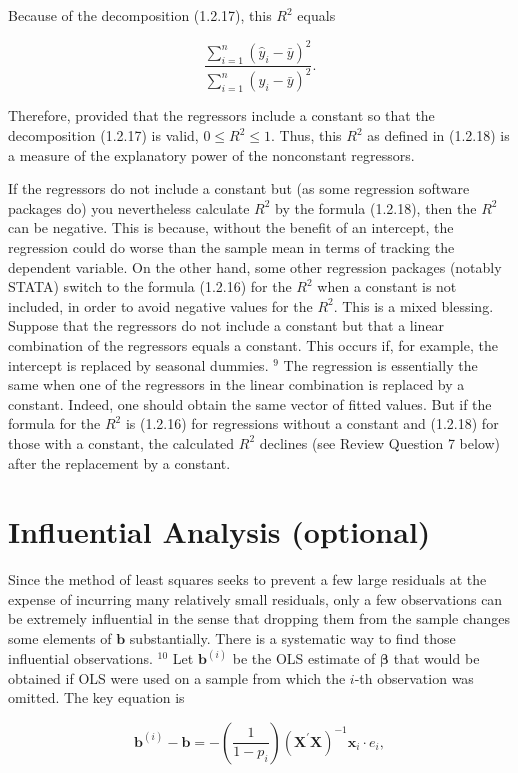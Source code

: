 \documentclass[10pt]{article}
\begin{document}
Because of the decomposition (1.2.17), this $R^{2}$ equals

$$
\frac{\sum_{i=1}^{n}\left(\hat{y}_{i}-\bar{y}\right)^{2}}{\sum_{i=1}^{n}\left(y_{i}-\bar{y}\right)^{2}} .
$$

Therefore, provided that the regressors include a constant so that the decomposition (1.2.17) is valid, $0 \leq R^{2} \leq 1$. Thus, this $R^{2}$ as defined in (1.2.18) is a measure of the explanatory power of the nonconstant regressors.

If the regressors do not include a constant but (as some regression software packages do) you nevertheless calculate $R^{2}$ by the formula (1.2.18), then the $R^{2}$ can be negative. This is because, without the benefit of an intercept, the regression could do worse than the sample mean in terms of tracking the dependent variable. On the other hand, some other regression packages (notably STATA) switch to the formula (1.2.16) for the $R^{2}$ when a constant is not included, in order to avoid negative values for the $R^{2}$. This is a mixed blessing. Suppose that the regressors do not include a constant but that a linear combination of the regressors equals a constant. This occurs if, for example, the intercept is replaced by seasonal dummies. ${ }^{9}$ The regression is essentially the same when one of the regressors in the linear combination is replaced by a constant. Indeed, one should obtain the same vector of fitted values. But if the formula for the $R^{2}$ is (1.2.16) for regressions without a constant and (1.2.18) for those with a constant, the calculated $R^{2}$ declines (see Review Question 7 below) after the replacement by a constant.

\section*{Influential Analysis (optional)}
Since the method of least squares seeks to prevent a few large residuals at the expense of incurring many relatively small residuals, only a few observations can be extremely influential in the sense that dropping them from the sample changes some elements of $\mathbf{b}$ substantially. There is a systematic way to find those influential observations. ${ }^{10}$ Let $\mathbf{b}^{(i)}$ be the OLS estimate of $\boldsymbol{\beta}$ that would be obtained if OLS were used on a sample from which the $i$-th observation was omitted. The key equation is


\begin{equation*}
\mathbf{b}^{(i)}-\mathbf{b}=-\left(\frac{1}{1-p_{i}}\right)\left(\mathbf{X}^{\prime} \mathbf{X}\right)^{-1} \mathbf{x}_{i} \cdot e_{i}, \tag{1.2.19}
\end{equation*}
\end{document}
